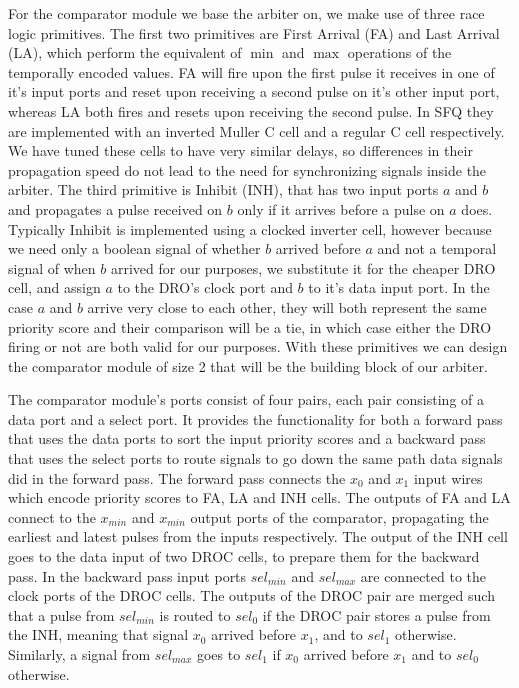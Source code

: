 \documentclass[conference]{IEEEtran}
\begin{document}
For the comparator module we base the arbiter on, we make use of three race logic primitives.
The first two primitives are First Arrival (FA) and Last Arrival (LA), which perform the equivalent of $\min$ and $\max$ operations of the temporally encoded values.
FA will fire upon the first pulse it receives in one of it's input ports and reset upon receiving a second pulse on it's other input port, whereas LA both fires and resets upon receiving the second pulse.
In SFQ they are implemented with an inverted Muller C cell and a regular C cell respectively.
We have tuned these cells to have very similar delays, so differences in their propagation speed do not lead to the need for synchronizing signals inside the arbiter.
The third primitive is Inhibit (INH), that has two input ports $a$ and $b$ and propagates a pulse received on $b$ only if it arrives before a pulse on $a$ does.
Typically Inhibit is implemented using a clocked inverter cell, however because we need only a boolean signal of whether $b$ arrived before $a$ and not a temporal signal of when $b$ arrived for our purposes, we substitute it for the cheaper DRO cell, and assign $a$ to the DRO's clock port and $b$ to it's data input port.
In the case $a$ and $b$ arrive very close to each other, they will both represent the same priority score and their comparison will be a tie, in which case either the DRO firing or not are both valid for our purposes.
With these primitives we can design the comparator module of size 2 that will be the building block of our arbiter.

The comparator module's ports consist of four pairs, each pair consisting of a data port and a select port.
It provides the functionality for both a forward pass that uses the data ports to sort the input priority scores and a backward pass that uses the select ports to route signals to go down the same path data signals did in the forward pass.
The forward pass connects the $x_0$ and $x_1$ input wires which encode priority scores to FA, LA and INH cells.
The outputs of FA and LA connect to the $x_{min}$ and $x_{min}$ output ports of the comparator, propagating the earliest and latest pulses from the inputs respectively.
The output of the INH cell goes to the data input of two DROC cells, to prepare them for the backward pass.
In the backward pass input ports $sel_{min}$ and $sel_{max}$ are connected to the clock ports of the DROC cells.
The outputs of the DROC pair are merged such that a pulse from $sel_{min}$ is routed to $sel_0$ if the DROC pair stores a pulse from the INH, meaning that signal $x_0$ arrived before $x_1$, and to $sel_1$ otherwise.
Similarly, a signal from $sel_{max}$ goes to $sel_1$ if $x_0$ arrived before $x_1$ and to $sel_0$ otherwise.
\end{document}

